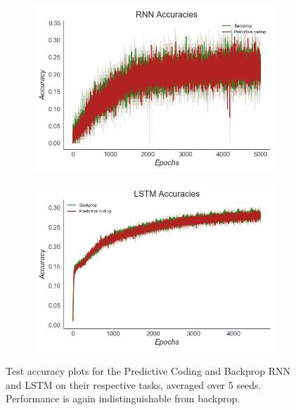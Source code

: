\begin{figure}[ht]
\vspace{-0.3cm}
\label{pc_rnn_lstm_results_figure}
\hspace{-0.6cm}
\begin{subfigure}{.5\textwidth}
  \centering
  \includegraphics[width=1\linewidth]{chapter_6_figures/RNN_Accuracies_super_prelim_6.jpg}  
\end{subfigure}
\begin{subfigure}{.5\textwidth}
  \centering
  \includegraphics[width=1\linewidth]{chapter_6_figures/LSTM_Accuracies_super_prelim_6.jpg}  
\end{subfigure}
\caption{Test accuracy plots for the Predictive Coding and Backprop RNN and LSTM on their respective tasks, averaged over 5 seeds. Performance is again indistinguishable from backprop.}
\label{fig:A}
\vspace{-0.3cm}
\end{figure}


